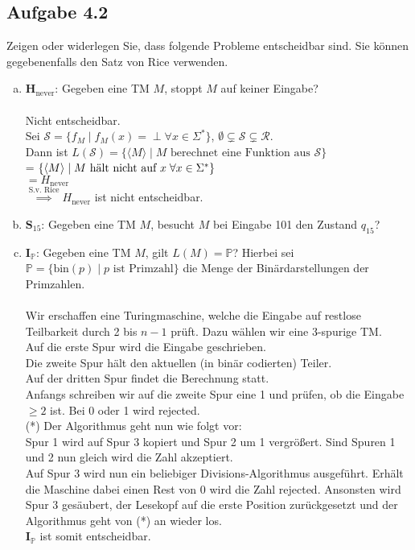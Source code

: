 \subsection*{Aufgabe 4.2}
Zeigen oder widerlegen Sie, dass folgende Probleme entscheidbar sind. Sie können gegebenenfalls den Satz von Rice verwenden.
\begin{enumerate}[(a)]
	\item $\textbf{H}_\text{never}$: Gegeben eine TM $M$, stoppt $M$ auf keiner Eingabe?\\\\
	Nicht entscheidbar.\\
	Sei $\mathcal{S} = \{f_M \mid f_M(x) = \perp \forall x \in \Sigma^{*} \}$, $\emptyset \subsetneq \mathcal{S} \subsetneq \mathcal{R} $.\\
	Dann ist $L(\mathcal{S}) = \{ \langle M \rangle \mid M \text{ berechnet eine Funktion aus } \mathcal{S} \}$\\
	= $\{ \langle M \rangle \mid M \text{ hält nicht auf } x \hspace{0.1cm}\forall x \in \Sigma^{*} \}$\\
	$=H_{\text{never}}$\\
	$\overset{\text{S.v. Rice}}{\implies} H_{\text{never}}$ ist nicht entscheidbar.\\
	
	\item $\textbf{S}_{15}$: Gegeben eine TM $M$, besucht $M$ bei Eingabe 101 den Zustand $q_{15}$?
	
	\item $\textbf{I}_\mathbb{P}$: Gegeben eine TM $M$, gilt $L(M)= \mathbb{P}$? Hierbei sei $\mathbb{P} = \{\text{bin}(p) \mid p \text{ ist Primzahl} \}$ die Menge der Binärdarstellungen der Primzahlen.\\\\
	Wir erschaffen eine Turingmaschine, welche die Eingabe auf restlose Teilbarkeit durch 2 bis $n-1$ prüft.
	Dazu wählen wir eine 3-spurige TM.\\
	Auf die erste Spur wird die Eingabe geschrieben.\\
	Die zweite Spur hält den aktuellen (in binär codierten) Teiler.\\
	Auf der dritten Spur findet die Berechnung statt.\\
	Anfangs schreiben wir auf die zweite Spur eine 1 und prüfen, ob die Eingabe $ \ge 2$ ist. Bei 0 oder 1 wird rejected.\\
	(*) Der Algorithmus geht nun wie folgt vor:\\
	Spur 1 wird auf Spur 3 kopiert und Spur 2 um 1 vergrößert. Sind Spuren 1 und 2 nun gleich wird die Zahl akzeptiert.\\
	Auf Spur 3 wird nun ein beliebiger Divisions-Algorithmus ausgeführt. Erhält die Maschine dabei einen Rest von 0 wird die Zahl rejected. Ansonsten wird Spur 3 gesäubert, der Lesekopf auf die erste Position zurückgesetzt und der Algorithmus geht von (*) an wieder los.\\
	$\textbf{I}_\mathbb{P}$ ist somit entscheidbar.\\
	

\end{enumerate}
